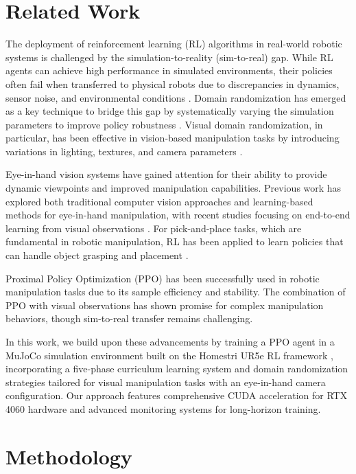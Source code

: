 \documentclass[conference]{IEEEtran}
\begin{document}
\section{Related Work}
The deployment of reinforcement learning (RL) algorithms in real-world robotic systems is challenged by the simulation-to-reality (sim-to-real) gap. While RL agents can achieve high performance in simulated environments, their policies often fail when transferred to physical robots due to discrepancies in dynamics, sensor noise, and environmental conditions \cite{zhao2020sim}. Domain randomization has emerged as a key technique to bridge this gap by systematically varying the simulation parameters to improve policy robustness \cite{tobin2017domain}. Visual domain randomization, in particular, has been effective in vision-based manipulation tasks by introducing variations in lighting, textures, and camera parameters \cite{garcia2023robust}.

Eye-in-hand vision systems have gained attention for their ability to provide dynamic viewpoints and improved manipulation capabilities. Previous work has explored both traditional computer vision approaches and learning-based methods for eye-in-hand manipulation, with recent studies focusing on end-to-end learning from visual observations \cite{kim2023giving}. For pick-and-place tasks, which are fundamental in robotic manipulation, RL has been applied to learn policies that can handle object grasping and placement \cite{gomes2021deep, iriondo2019pick}.

Proximal Policy Optimization (PPO) \cite{schulman2017proximal} has been successfully used in robotic manipulation tasks due to its sample efficiency and stability. The combination of PPO with visual observations has shown promise for complex manipulation behaviors, though sim-to-real transfer remains challenging.

In this work, we build upon these advancements by training a PPO agent in a MuJoCo simulation environment built on the Homestri UR5e RL framework \cite{chuang2024homestri}, incorporating a five-phase curriculum learning system and domain randomization strategies tailored for visual manipulation tasks with an eye-in-hand camera configuration. Our approach features comprehensive CUDA acceleration for RTX 4060 hardware and advanced monitoring systems for long-horizon training.

\section{Methodology}
\end{document}
